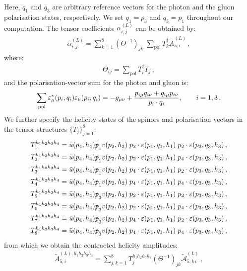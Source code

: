 \documentclass[main.tex]{subfiles}
\begin{document}
Here, $q_1$ and $q_3$ are arbitrary reference vectors for the photon and the gluon polarisation states, respectively.
We set $q_1=p_3$ and $q_3=p_1$ throughout our computation.
The tensor coefficients $\alpha^{(L)}_{i,j}$ can be obtained by:
\begin{align}
\alpha^{(L)}_{i,j} = \sum_{k=1}^{8} \left(\Theta^{-1}\right)_{jk} \; \sum_{\text{pol}} {T}_{k}^\dagger \tilde{A}_{5,i}^{(L)} \,,
\end{align}
where:
\begin{align}
\Theta_{ij}  = \sum_{\text{pol}} T_{i}^\dagger T_{j} \,,
\end{align}
and the polarisation-vector sum for the photon and gluon is:
\begin{align}
\sum_{\text{pol}} \varepsilon^*_\mu(p_i,q_i) \varepsilon_\nu(p_i,q_i) = -g_{\mu\nu} + \frac{ p_{i\mu}q_{i\nu} + q_{i\mu}p_{i\nu} }{p_i \cdot q_i}, \qquad i=1,3\,.
\label{Wyjeq:polsum}
\end{align}
We further specify the helicity states of the spinors and polarisation vectors in the tensor structures $\{T_j\}_{j=1}^8$:
\begin{align}
T^{h_1 h_2 h_3 h_4}_{1} & = \bar{u}(p_4,h_4) \slashed{p}_{1} v(p_2,h_2) \; p_{2}\cdot \varepsilon(p_1,q_1,h_1) \; p_{2}\cdot\varepsilon(p_3,q_3,h_3) \,, \nonumber \\ 
T^{h_1 h_2 h_3 h_4}_{2} & = \bar{u}(p_4,h_4) \slashed{p}_{1} v(p_2,h_2) \; p_{2}\cdot \varepsilon(p_1,q_1,h_1) \; p_{4}\cdot\varepsilon(p_3,q_3,h_3) \,, \nonumber \\ 
T^{h_1 h_2 h_3 h_4}_{3} & = \bar{u}(p_4,h_4) \slashed{p}_{1} v(p_2,h_2) \; p_{4}\cdot \varepsilon(p_1,q_1,h_1) \; p_{2}\cdot\varepsilon(p_3,q_3,h_3) \,, \nonumber \\ 
T^{h_1 h_2 h_3 h_4}_{4} & = \bar{u}(p_4,h_4) \slashed{p}_{1} v(p_2,h_2) \; p_{4}\cdot \varepsilon(p_1,q_1,h_1) \; p_{4}\cdot\varepsilon(p_3,q_3,h_3) \,, \\
T^{h_1 h_2 h_3 h_4}_{5} & = \bar{u}(p_4,h_4) \slashed{p}_{3} v(p_2,h_2) \; p_{2}\cdot \varepsilon(p_1,q_1,h_1) \; p_{2}\cdot\varepsilon(p_3,q_3,h_3) \,, \nonumber \\ 
T^{h_1 h_2 h_3 h_4}_{6} & = \bar{u}(p_4,h_4) \slashed{p}_{3} v(p_2,h_2) \; p_{2}\cdot \varepsilon(p_1,q_1,h_1) \; p_{4}\cdot\varepsilon(p_3,q_3,h_3) \,, \nonumber \\ 
T^{h_1 h_2 h_3 h_4}_{7} & = \bar{u}(p_4,h_4) \slashed{p}_{3} v(p_2,h_2) \; p_{4}\cdot \varepsilon(p_1,q_1,h_1) \; p_{2}\cdot\varepsilon(p_3,q_3,h_3) \,, \nonumber \\ 
T^{h_1 h_2 h_3 h_4}_{8} & = \bar{u}(p_4,h_4) \slashed{p}_{3} v(p_2,h_2) \; p_{4}\cdot \varepsilon(p_1,q_1,h_1) \; p_{4}\cdot\varepsilon(p_3,q_3,h_3) \,, \nonumber
\end{align}
from which we obtain the contracted helicity amplitudes:
\begin{align}
\label{Wyjeq:A5Ldef}
\tilde{A}_{5,i}^{(L),h_1 h_2 h_3 h_4} = \sum_{j,k=1}^{8} T_{j}^{h_1 h_2 h_3 h_4} \left(\Theta^{-1}\right)_{jk} \tilde{\mathcal{A}}_{5,k \, i}^{(L)} \,,
\end{align}
\end{document}
